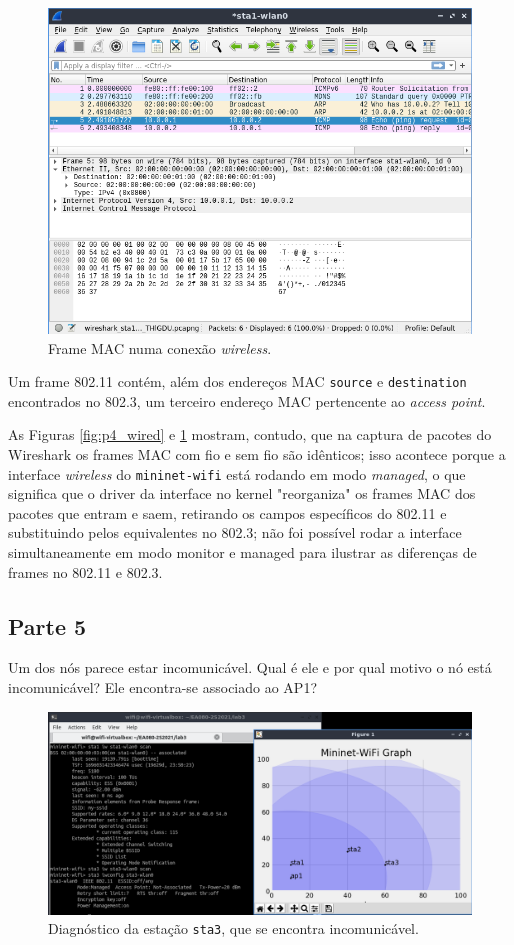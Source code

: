 \documentclass{article}
\begin{document}
\begin{figure}[!htb]
\centering
\includegraphics[width=0.8\columnwidth]{images/p4_wireless.png}
\caption{Frame MAC numa conexão \textit{wireless}.}
\label{fig:p4_wireless}
\end{figure}


Um frame 802.11 contém, além dos endereços MAC
\texttt{source} e \texttt{destination} encontrados
no 802.3, um terceiro endereço MAC pertencente ao
\textit{access point}.

As Figuras \ref{fig:p4_wired} e \ref{fig:p4_wireless}
mostram, contudo, que na captura de pacotes do Wireshark
os frames MAC com fio e sem fio são idênticos; isso
acontece porque a interface \textit{wireless} do
\texttt{mininet-wifi} está rodando em modo \textit{managed},
o que significa que o driver da interface no kernel
"reorganiza" os
frames MAC dos pacotes que entram e saem, retirando os
campos específicos do 802.11 e substituindo pelos
equivalentes no 802.3; não foi possível rodar a interface
simultaneamente em modo monitor e managed para ilustrar
as diferenças de frames no 802.11 e 802.3.

\FloatBarrier

\subsection{Parte 5}

\begin{tcolorbox}
    Um dos nós parece estar incomunicável. Qual é ele e por qual motivo o nó está incomunicável? Ele encontra-se associado ao AP1?
\end{tcolorbox}

\begin{figure}[!htb]
\centering
\includegraphics[width=0.8\columnwidth]{images/p5_scan.png}
\caption{Diagnóstico da estação \texttt{sta3}, que se encontra incomunicável.}
\label{fig:p5_scan}
\end{figure}
\end{document}
